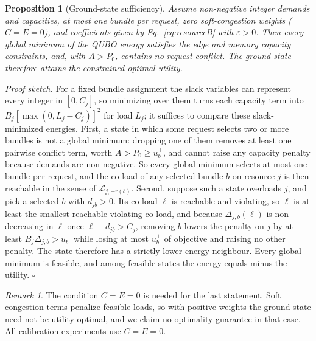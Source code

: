 \documentclass[pdflatex,sn-nature]{sn-jnl}
\newcommand{\eps}{\varepsilon}
\theoremstyle{plain}
\newtheorem{proposition}{Proposition}
\theoremstyle{remark}
\newtheorem{remark}{Remark}
\begin{document}
\begin{proposition}[Ground-state sufficiency]\label{prop:ground}
Assume non-negative integer demands and capacities, at most one bundle per request, zero soft-congestion weights ($C=E=0$), and coefficients given by Eq.~\ref{eq:resourceB} with $\eps>0$. Then every global minimum of the QUBO energy satisfies the edge and memory capacity constraints, and, with $A>P_0$, contains no request conflict. The ground state therefore attains the constrained optimal utility.
\end{proposition}
\noindent\textit{Proof sketch.} For a fixed bundle assignment the slack variables can represent every integer in $[0,C_j]$, so minimizing over them turns each capacity term into $B_j[\max(0,L_j-C_j)]^2$ for load $L_j$; it suffices to compare these slack-minimized energies. First, a state in which some request selects two or more bundles is not a global minimum: dropping one of them removes at least one pairwise conflict term, worth $A>P_0\ge u_b^+$, and cannot raise any capacity penalty because demands are non-negative. So every global minimum selects at most one bundle per request, and the co-load of any selected bundle $b$ on resource $j$ is then reachable in the sense of $\mathcal{L}_{j,-r(b)}$. Second, suppose such a state overloads $j$, and pick a selected $b$ with $d_{jb}>0$. Its co-load $\ell$ is reachable and violating, so $\ell$ is at least the smallest reachable violating co-load, and because $\Delta_{j,b}(\ell)$ is non-decreasing in $\ell$ once $\ell+d_{jb}>C_j$, removing $b$ lowers the penalty on $j$ by at least $B_j\Delta_{j,b}>u_b^+$ while losing at most $u_b^+$ of objective and raising no other penalty. The state therefore has a strictly lower-energy neighbour. Every global minimum is feasible, and among feasible states the energy equals minus the utility. $\square$

\begin{remark}
The condition $C=E=0$ is needed for the last statement. Soft congestion terms penalize feasible loads, so with positive weights the ground state need not be utility-optimal, and we claim no optimality guarantee in that case. All calibration experiments use $C=E=0$.
\end{remark}
\end{document}
